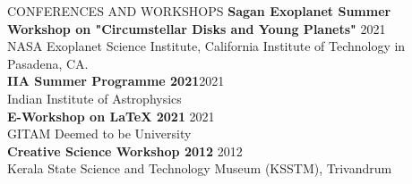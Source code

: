 \documentclass{resume} %
\begin{document}
\begin{rSection}{CONFERENCES AND WORKSHOPS }
	\textbf{Sagan Exoplanet Summer Workshop on "Circumstellar Disks and Young Planets"} \hfill 2021\\
	NASA Exoplanet Science Institute, California Institute of Technology in Pasadena, CA.  \\
	\textbf{IIA Summer Programme 2021}\hfill 2021\\
	Indian Institute of Astrophysics  \\
	\textbf{E-Workshop on LaTeX 2021 }\hfill 2021\\
	GITAM Deemed to be University \\
	\textbf{Creative Science Workshop 2012 } \hfill 2012\\
	Kerala State Science and Technology Museum (KSSTM), Trivandrum \\
\end{rSection}
\end{document}
